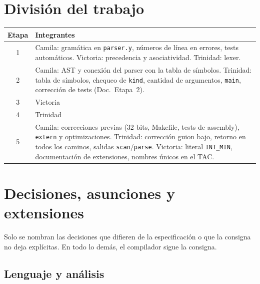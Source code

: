 \documentclass[11pt,a4paper]{article}
\newcommand{\code}[1]{\texttt{#1}}
\newcommand{\doc}[1]{(Doc.\ Etapa~#1)}
\begin{document}
\section{División del trabajo}

\begin{tabularx}{\textwidth}{cL}
\toprule
\textbf{Etapa} & \textbf{Integrantes} \\
 & Camila: gramática en \code{parser.y}, números de línea en errores, tests automáticos. Victoria: precedencia y asociatividad. Trinidad: lexer. \\
2 & Camila: AST y conexión del parser con la tabla de símbolos. Trinidad: tabla de símbolos, chequeo de \code{kind}, cantidad de argumentos, \code{main}, corrección de tests \doc{2}. \\
3 & Victoria \\
4 & Trinidad \\
5 & Camila: correcciones previas (32 bits, Makefile, tests de assembly), \code{extern} y optimizaciones. Trinidad: corrección guion bajo, retorno en todos los caminos, salidas \code{scan}/\code{parse}. Victoria: literal \code{INT\_MIN}, documentación de extensiones, nombres únicos en el TAC. \\
\bottomrule
\end{tabularx}

\section{Decisiones, asunciones y extensiones}

Solo se nombran las decisiones que difieren de la especificación o que la consigna no deja explícitas. En todo lo demás, el compilador sigue la consigna.

\subsection*{Lenguaje y análisis}
\end{document}
